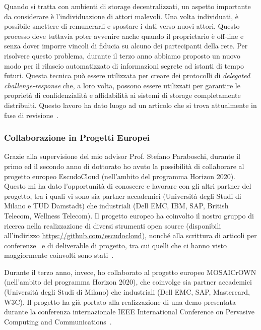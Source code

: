 \documentclass{article}
\begin{document}
\medskip
Quando si tratta con ambienti di storage decentralizzati, un aspetto importante da considerare è l'individuazione di attori malevoli. Una volta individuati, è possibile smettere di remunerarli e spostare i dati verso nuovi attori. Questo processo deve tuttavia poter avvenire anche quando il proprietario è off-line e senza dover imporre vincoli di fiducia su alcuno dei partecipanti della rete. Per risolvere questo problema, durante il terzo anno abbiamo proposto un nuovo modo per il rilascio automatizzato di informazioni segrete ad istanti di tempo futuri. Questa tecnica può essere utilizzata per creare dei protocolli di {\em delegated challenge-response} che, a loro volta, possono essere utilizzati per garantire le proprietà di confidenzialità e affidabilità ai sistemi di storage completamente distribuiti. Questo lavoro ha dato luogo ad un articolo che si trova attualmente in fase di revisione~\cite{ityt}.

\subsubsection*{Collaborazione in Progetti Europei}

Grazie alla supervisione del mio advisor Prof. Stefano Paraboschi, durante il primo ed il secondo anno di dottorato ho avuto la possibilità di collaborare al progetto europeo EscudoCloud (nell’ambito del programma Horizon 2020). Questo mi ha dato l’opportunità di conoscere e lavorare con gli altri partner del progetto, tra i quali vi sono sia partner accademici (Università degli Studi di Milano e TUD Damstadt) che industriali (Dell EMC, IBM, SAP, British Telecom, Wellness Telecom).
Il progetto europeo ha coinvolto il nostro gruppo di ricerca nella realizzazione di diversi strumenti open source (disponibili all’indirizzo \url{https://github.com/escudocloud}), nonché alla scrittura di articoli per conferenze~\cite{wiscs,cscloud,cns,spc} e di deliverable di progetto, tra cui quelli che ci hanno visto maggiormente coinvolti sono stati~\cite{d23,d26,d34,d35,d43,d44}.

\medskip

Durante il terzo anno, invece, ho collaborato al progetto europeo MOSAICrOWN (nell'ambito del programma Horizon 2020), che coinvolge sia partner accademici (Università degli Studi di Milano) che industriali (Dell EMC, SAP, Mastercard, W3C). Il progetto ha già portato alla realizzazione di una demo presentata durante la conferenza internazionale IEEE International Conference on Pervasive Computing and Communications~\cite{percom}.
\end{document}
